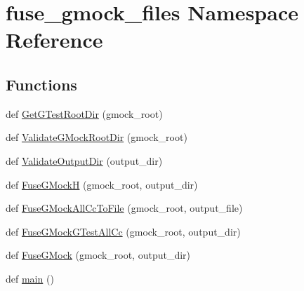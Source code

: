 \hypertarget{namespacefuse__gmock__files}{}\section{fuse\+\_\+gmock\+\_\+files Namespace Reference}
\label{namespacefuse__gmock__files}
\subsection*{Functions}
\begin{DoxyCompactItemize}
\item 
def \mbox{\hyperlink{namespacefuse__gmock__files_aae591d77d2d969394996f9fc2017824c}{Get\+G\+Test\+Root\+Dir}} (gmock\+\_\+root)
\item 
def \mbox{\hyperlink{namespacefuse__gmock__files_aaec09f55a62b3d65b5d25fe0050e9e05}{Validate\+G\+Mock\+Root\+Dir}} (gmock\+\_\+root)
\item 
def \mbox{\hyperlink{namespacefuse__gmock__files_a68581e210793099d656537faa719df29}{Validate\+Output\+Dir}} (output\+\_\+dir)
\item 
def \mbox{\hyperlink{namespacefuse__gmock__files_abab451606f671f59404f23276aad2c34}{Fuse\+G\+MockH}} (gmock\+\_\+root, output\+\_\+dir)
\item 
def \mbox{\hyperlink{namespacefuse__gmock__files_af470a39a4df492b1ca0d9493eac8222b}{Fuse\+G\+Mock\+All\+Cc\+To\+File}} (gmock\+\_\+root, output\+\_\+file)
\item 
def \mbox{\hyperlink{namespacefuse__gmock__files_a50eb499fcb075e19191e8403bd85c813}{Fuse\+G\+Mock\+G\+Test\+All\+Cc}} (gmock\+\_\+root, output\+\_\+dir)
\item 
def \mbox{\hyperlink{namespacefuse__gmock__files_ae76b6bc18373325fc3f002abf5c4378f}{Fuse\+G\+Mock}} (gmock\+\_\+root, output\+\_\+dir)
\item 
def \mbox{\hyperlink{namespacefuse__gmock__files_a64e8cd1ead5a1454265cbc2d3db4d425}{main}} ()
\end{DoxyCompactItemize}
